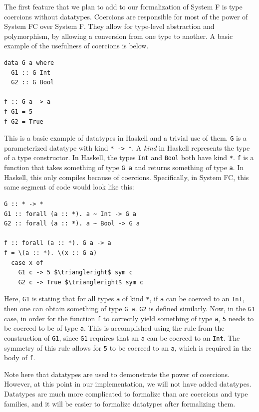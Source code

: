 \documentclass{sig-alternate}
\begin{document}
The first feature that we plan to add to our formalization of System F is type coercions without datatypes.  Coercions are responsible for most of the power of System FC over System F.  They allow for type-level abstraction and polymorphism, by allowing a conversion from one type to another. A basic example of the usefulness of coercions is below.
\begin{verbatim}
data G a where
  G1 :: G Int
  G2 :: G Bool

f :: G a -> a
f G1 = 5
f G2 = True
\end{verbatim}
This is a basic example of datatypes in Haskell and a trivial use of them. \texttt{G} is a parameterized datatype with kind \texttt{* -> *}. A \textit{kind} in Haskell represents the type of a type constructor. In Haskell, the types \texttt{Int} and \texttt{Bool} both have kind \texttt{*}. \texttt{f} is a function that takes something of type \texttt{G a} and returns something of type \texttt{a}. In Haskell, this only compiles because of coercions. Specifically, in System FC, this same segment of code would look like this:
\begin{lstlisting}
G :: * -> *
G1 :: forall (a :: *). a ~ Int -> G a
G2 :: forall (a :: *). a ~ Bool -> G a

f :: forall (a :: *). G a -> a
f = \(a :: *). \(x :: G a)
  case x of
    G1 c -> 5 $\triangleright$ sym c
    G2 c -> True $\triangleright$ sym c
\end{lstlisting}
Here, \texttt{G1} is stating that for all types \texttt{a} of kind \texttt{*}, if \texttt{a} can be coerced to an \texttt{Int}, then one can obtain something of type \texttt{G a}. \texttt{G2} is defined similarly. Now, in the \texttt{G1} case, in order for the function \texttt{f} to correctly yield something of type \texttt{a}, \texttt{5} needs to be coerced to be of type \texttt{a}. This is accomplished using the rule from the construction of \texttt{G1}, since \texttt{G1} requires that an \texttt{a} can be coerced to an \texttt{Int}. The symmetry of this rule allows for \texttt{5} to be coerced to an \texttt{a}, which is required in the body of \texttt{f}. 

Note here that datatypes are used to demonstrate the power of coercions. However, at this point in our implementation, we will not have added datatypes. Datatypes are much more complicated to formalize than are coercions and type families, and it will be easier to formalize datatypes after formalizing them.

\end{document}
